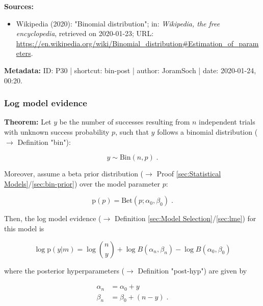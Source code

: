 \documentclass[a4paper,12pt]{book}
\begin{document}
\vspace{1em}
\textbf{Sources:}
\begin{itemize}
\item Wikipedia (2020): "Binomial distribution"; in: \textit{Wikipedia, the free encyclopedia}, retrieved on 2020-01-23; URL: \url{https://en.wikipedia.org/wiki/Binomial_distribution#Estimation_of_parameters}.
\end{itemize}


\vspace{1em}
\textbf{Metadata:} ID: P30 | shortcut: bin-post | author: JoramSoch | date: 2020-01-24, 00:20.


\subsubsection[\textbf{Log model evidence}]{Log model evidence} \label{sec:bin-lme}

\vspace{1em}
\textbf{Theorem:} Let $y$ be the number of successes resulting from $n$ independent trials with unknown success probability $p$, such that $y$ follows a binomial distribution ($\rightarrow$ Definition "bin"):

\begin{equation} \label{eq:bin-lme-Bin}
y \sim \mathrm{Bin}(n,p) \; .
\end{equation}

Moreover, assume a beta prior distribution ($\rightarrow$ Proof \ref{sec:Statistical Models}/\ref{sec:bin-prior}) over the model parameter $p$:

\begin{equation} \label{eq:bin-lme-Bin-prior}
\mathrm{p}(p) = \mathrm{Bet}(p; \alpha_0, \beta_0) \; .
\end{equation}

Then, the log model evidence ($\rightarrow$ Definition \ref{sec:Model Selection}/\ref{sec:lme}) for this model is

\begin{equation} \label{eq:bin-lme-Bin-LME}
\log \mathrm{p}(y|m) = \log {n \choose y} + \log B(\alpha_n,\beta_n) - \log B(\alpha_0,\beta_0)
\end{equation}

where the posterior hyperparameters ($\rightarrow$ Definition "post-hyp") are given by

\begin{equation} \label{eq:bin-lme-Bin-post-par}
\begin{split}
\alpha_n &= \alpha_0 + y \\
\beta_n &= \beta_0 + (n-y) \; .
\end{split}
\end{equation}
\end{document}
